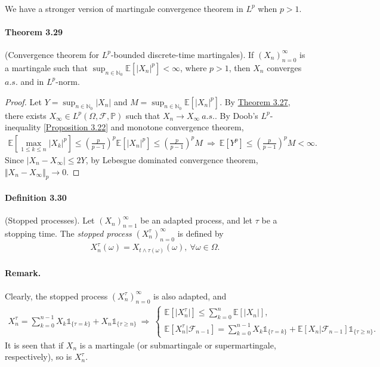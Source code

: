 \documentclass{article}
\numberwithin{equation}{section}
\newcommand{\E}{\mathbb{E}}
\renewcommand{\P}{\mathbb{P}}
\theoremstyle{plain}
\theoremstyle{definition}
\begin{document}
\paragraph{} We have a stronger version of martingale convergence theorem in $L^p$ when $p>1$.
\paragraph{Theorem 3.29\label{thm:3.29}} (Convergence theorem for $L^p$-bounded discrete-time martingales). If $(X_n)_{n=0}^\infty$ is a martingale such that $\sup_{n\in\mathbb{N}_0}\E\left[\vert X_n\vert^p\right]<\infty$, where $p>1$, then $X_n$ converges $a.s.$ and in $L^p$-norm.
\begin{proof}
Let $Y=\sup_{n\in\mathbb{N}_0}\vert X_n\vert$ and $M=\sup_{n\in\mathbb{N}_0}\E\left[\vert X_n\vert^p\right]$. By \hyperref[thm:3.27]{Theorem 3.27}, there exists $X_\infty\in L^p(\Omega,\mathscr{F},\P)$ such that $X_n\to X_\infty\ a.s.$. By Doob's $L^p$-inequality [\hyperref[prop:3.22]{Proposition 3.22}] and monotone convergence theorem,
\begin{align*}
	\E\left[\max_{1\leq k\leq n}\vert X_k\vert^p\right]\leq\left(\frac{p}{p-1}\right)^p\E\left[\vert X_n\vert^p\right]\leq\left(\frac{p}{p-1}\right)^p M\ \Rightarrow\ \E[Y^p]\leq\left(\frac{p}{p-1}\right)^p M < \infty.
\end{align*}
Since $\vert X_n-X_\infty\vert\leq 2Y$, by Lebesgue dominated convergence theorem, $\Vert X_n-X_\infty\Vert_p\to 0$.
\end{proof}

\paragraph{Definition 3.30\label{def:3.30}} (Stopped processes). Let $(X_n)_{n=1}^\infty$ be an adapted process, and let $\tau$ be a stopping time. The \textit{stopped process} $(X_n^\tau)_{n=0}^\infty$ is defined by
\begin{align*}
	X_n^\tau(\omega)=X_{t\wedge\tau(\omega)}(\omega),\ \forall\omega\in\Omega.
\end{align*}
\paragraph{Remark.} Clearly, the stopped process $(X_n^\tau)_{n=0}^\infty$ is also adapted, and
\begin{align*}
	X_n^\tau = \sum_{k=0}^{n-1}X_k\mathds{1}_{\{\tau=k\}} + X_n\mathds{1}_{\{\tau\geq n\}}\ \Rightarrow\ \begin{cases}
		\E[\vert X_n^\tau\vert]\leq \sum_{k=0}^n\E[\vert X_n\vert],\\
		\E[X_n^\tau|\mathscr{F}_{n-1}] = \sum_{k=0}^{n-1}X_k\mathds{1}_{\{\tau=k\}} + \E[X_n|\mathscr{F}_{n-1}]\mathds{1}_{\{\tau\geq n\}}.
	\end{cases}
\end{align*}
It is seen that if $X_n$ is a martingale (or submartingale or supermartingale, respectively), so is $X_n^\tau$.
\end{document}
